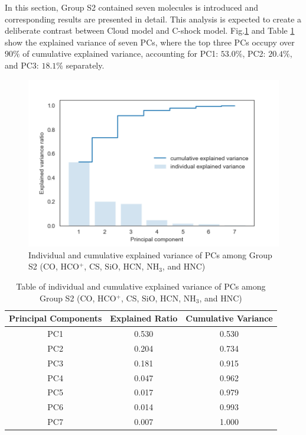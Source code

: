 \documentclass{aa}
\begin{document}
\begin{CJK*}{UTF8}{gbsn}
    In this section, Group S2 contained seven molecules is introduced and corresponding results are presented in detail. 
    This analysis is expected to create a deliberate contrast between Cloud model and C-shock model. 
    Fig.\ref{Fig-shock-2-varianve} and Table \ref{table-shock-2-1} show the explained variance of seven PCs, where the top three PCs occupy over $90\%$ of cumulative explained variance, accounting for PC1: $53.0\%$, PC2: $20.4\%$, and PC3: $18.1\%$ separately. 
 
  \begin{figure}[htp]
   \centering
   \captionsetup{justification=centering}
   \includegraphics[angle=0,scale =0.6]{shock-2/explained_variance_ratio.png}
   \caption{Individual and cumulative explained variance of PCs among Group S2 (CO, HCO$^+$, CS, SiO, HCN, NH$_3$, and HNC)}
\label{Fig-shock-2-varianve}
   \end{figure}
   

\begin{table}[htp]
\centering
\begin{tabular}{ccc}
\hline\hline
\multicolumn{1}{l}{Principal Components} & \multicolumn{1}{l}{Explained Ratio} & Cumulative Variance \\ \hline
        PC1 & 0.530  & 0.530\\ 
        PC2 & 0.204  & 0.734\\
        PC3 & 0.181  & 0.915\\
        PC4 & 0.047  & 0.962\\ 
        PC5 & 0.017  & 0.979\\
        PC6 & 0.014  & 0.993\\
        PC7 & 0.007  & 1.000\\\hline\hline
\end{tabular}
\caption{Table of individual and cumulative explained variance of PCs among Group S2 (CO, HCO$^+$, CS, SiO, HCN, NH$_3$, and HNC)}
\label{table-shock-2-1}
\end{table}


\end{CJK*}
\end{document}
